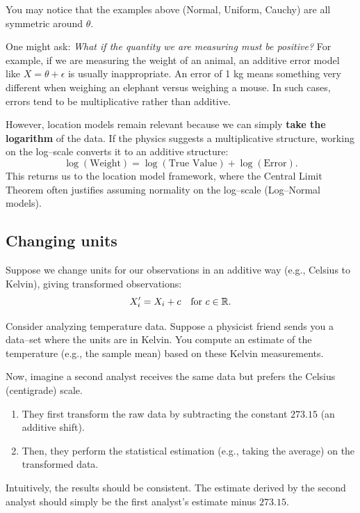 \begin{note}
You may notice that the examples above (Normal, Uniform, Cauchy) are all symmetric around \(\theta\). 

One might ask: \textit{What if the quantity we are measuring must be positive?} For example, if we are measuring the weight of an animal, an additive error model like \(X = \theta + \epsilon\) is usually inappropriate. An error of 1 kg means something very different when weighing an elephant versus weighing a mouse. In such cases, errors tend to be multiplicative rather than additive.

However, location models remain relevant because we can simply \textbf{take the logarithm} of the data. If the physics suggests a multiplicative structure, working on the log--scale converts it to an additive structure:
\[ \log(\text{Weight}) = \log(\text{True Value}) + \log(\text{Error}). \]
This returns us to the location model framework, where the Central Limit Theorem often justifies assuming normality on the log--scale (Log--Normal models).
\end{note}

\subsection{Changing units}
\label{subsec:changing_units}

\label{subsubsec:additive_change}
Suppose we change units for our observations in an additive way (e.g., Celsius to Kelvin), giving transformed observations:
\[
X_i' = X_i + c \quad \text{for } c \in \mathbb{R}.
\]

\begin{ex}
Consider analyzing temperature data. Suppose a physicist friend sends you a data--set where the units are in Kelvin. You compute an estimate of the temperature (e.g., the sample mean) based on these Kelvin measurements.

Now, imagine a second analyst receives the same data but prefers the Celsius (centigrade) scale. 
\begin{enumerate}
    \item They first transform the raw data by subtracting the constant $273.15$ (an additive shift).
    \item Then, they perform the statistical estimation (e.g., taking the average) on the transformed data.
\end{enumerate}

Intuitively, the results should be consistent. The estimate derived by the second analyst should simply be the first analyst's estimate minus $273.15$.
\end{ex}

